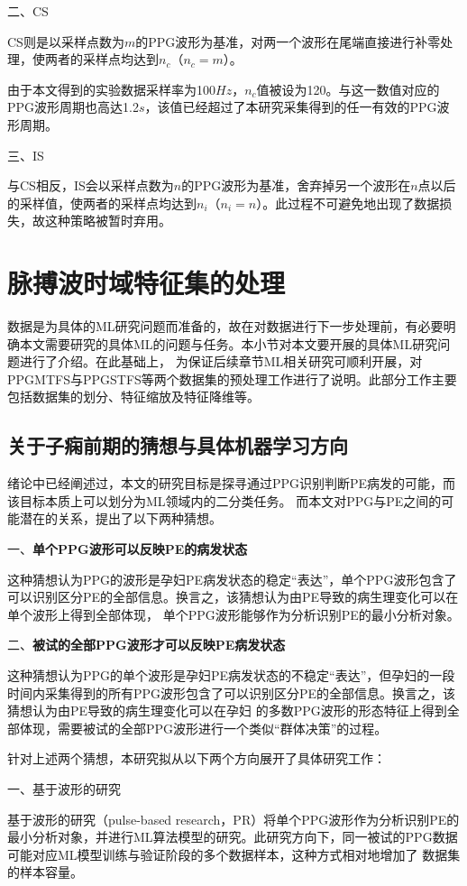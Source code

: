 二、CS

CS则是以采样点数为$m$的PPG波形为基准，对两一个波形在尾端直接进行补零处理，使两者的采样点均达到$n_c$（$n_c=m$）。

由于本文得到的实验数据采样率为100$Hz$，$n_c$值被设为120。与这一数值对应的PPG波形周期也高达1.2$s$，该值已经超过了本研究采集得到的任一有效的PPG波形周期。

三、IS

与CS相反，IS会以采样点数为$n$的PPG波形为基准，舍弃掉另一个波形在$n$点以后的采样值，使两者的采样点均达到$n_i$（$n_i=n$）。此过程不可避免地出现了数据损失，故这种策略被暂时弃用。

\section{脉搏波时域特征集的处理}
数据是为具体的ML研究问题而准备的，故在对数据进行下一步处理前，有必要明确本文需要研究的具体ML的问题与任务。本小节对本文要开展的具体ML研究问题进行了介绍。在此基础上，
为保证后续章节ML相关研究可顺利开展，对PPGMTFS与PPGSTFS等两个数据集的预处理工作进行了说明。此部分工作主要包括数据集的划分、特征缩放及特征降维等。

\subsection{关于子痫前期的猜想与具体机器学习方向}
绪论中已经阐述过，本文的研究目标是探寻通过PPG识别判断PE病发的可能，而该目标本质上可以划分为ML领域内的二分类任务。
而本文对PPG与PE之间的可能潜在的关系，提出了以下两种猜想。

一、\textbf{单个PPG波形可以反映PE的病发状态}

这种猜想认为PPG的波形是孕妇PE病发状态的稳定“表达”，单个PPG波形包含了可以识别区分PE的全部信息。换言之，该猜想认为由PE导致的病生理变化可以在单个波形上得到全部体现，
单个PPG波形能够作为分析识别PE的最小分析对象。

二、\textbf{被试的全部PPG波形才可以反映PE病发状态}

这种猜想认为PPG的单个波形是孕妇PE病发状态的不稳定“表达”，但孕妇的一段时间内采集得到的所有PPG波形包含了可以识别区分PE的全部信息。换言之，该猜想认为由PE导致的病生理变化可以在孕妇
的多数PPG波形的形态特征上得到全部体现，需要被试的全部PPG波形进行一个类似“群体决策”的过程。

针对上述两个猜想，本研究拟从以下两个方向展开了具体研究工作：

一、基于波形的研究

基于波形的研究（pulse-based research，PR）将单个PPG波形作为分析识别PE的最小分析对象，并进行ML算法模型的研究。此研究方向下，同一被试的PPG数据可能对应ML模型训练与验证阶段的多个数据样本，这种方式相对地增加了
数据集的样本容量。

